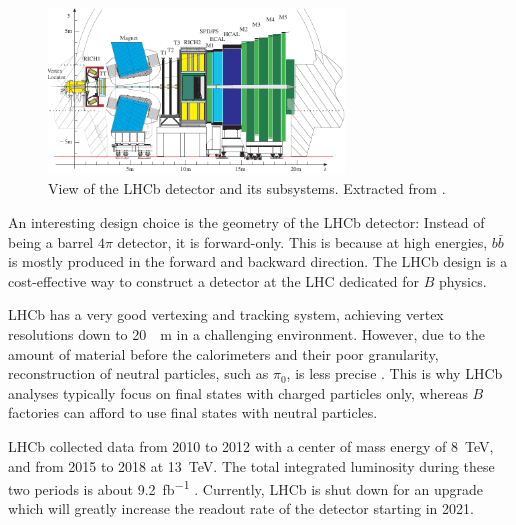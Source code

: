 \begin{figure}[ht]
    \centering
    \includegraphics[width=0.7\textwidth]{figs/lhcb_detector_view.pdf}
    \caption{
        View of the LHCb detector and its subsystems.
        Extracted from \cite{LHCb:2003ab}.
    }
    \label{fig:lhcb_detector_view}
\end{figure}

An interesting design choice is the geometry of the LHCb detector:
Instead of being a barrel $4\pi$ detector, it is forward-only.
This is because at high energies, $b\bar{b}$ is mostly produced in the forward
and backward direction.
The LHCb design is a cost-effective way to construct a detector at the LHC
dedicated for $B$ physics.

LHCb has a very good vertexing and tracking system, achieving vertex resolutions
down to \SI{20}{\mu m} in a challenging environment.
However, due to the amount of material before the calorimeters and their poor
granularity,
reconstruction of neutral particles, such as $\pi_0$, is less
precise \cite{LHCb:2008,Guz:2017}.
This is why LHCb analyses typically focus on final states with charged particles
only, whereas $B$ factories can afford to use final states with neutral
particles.

LHCb collected data from 2010 to 2012 with a center of mass energy of
\SI{8}{TeV}, and from 2015 to 2018 at \SI{13}{TeV}.
The total integrated luminosity during these two periods is about
\SI{9.2}{fb^{-1}} \cite{LHCb-Lumi:2019}.
Currently, LHCb is shut down for an upgrade which will greatly increase the
readout rate of the detector starting in 2021.
